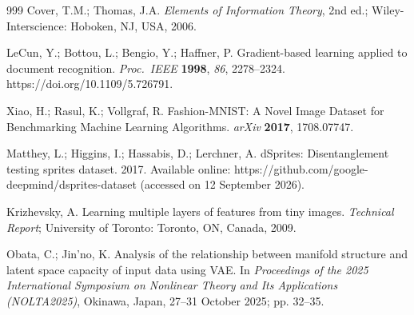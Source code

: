 \documentclass[make,article,submit,pdftex,moreauthors]{Definitions/mdpi}
\begin{document}
\begin{thebibliography}{999}
Cover, T.M.; Thomas, J.A.
\textit{Elements of Information Theory}, 2nd ed.;
Wiley-Interscience: Hoboken, NJ, USA, 2006.

LeCun, Y.; Bottou, L.; Bengio, Y.; Haffner, P.
Gradient-based learning applied to document recognition.
\textit{Proc.\ IEEE} \textbf{1998}, \textit{86}, 2278--2324.
https://doi.org/10.1109/5.726791.

Xiao, H.; Rasul, K.; Vollgraf, R.
Fashion-{MNIST}: A Novel Image Dataset for Benchmarking Machine Learning
Algorithms.
\textit{arXiv} \textbf{2017}, 1708.07747.

Matthey, L.; Higgins, I.; Hassabis, D.; Lerchner, A.
dSprites: Disentanglement testing sprites dataset. 2017.
Available online: https://github.com/google-deepmind/dsprites-dataset
(accessed on 12 September 2026).

Krizhevsky, A.
Learning multiple layers of features from tiny images.
\textit{Technical Report}; University of Toronto: Toronto, ON, Canada,
2009.

Obata, C.; Jin'no, K.
Analysis of the relationship between manifold structure and latent space
capacity of input data using VAE.
In \textit{Proceedings of the 2025 International Symposium on Nonlinear
Theory and Its Applications (NOLTA2025)}, Okinawa, Japan, 27--31 October
2025; pp. 32--35.

\end{thebibliography}
\end{document}
